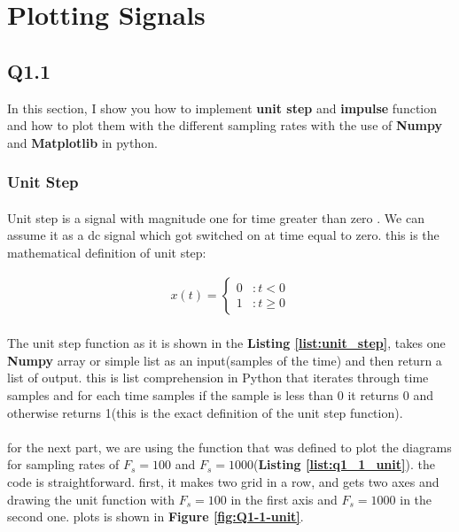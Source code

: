 \section{Plotting Signals}
\subsection{Q1.1}
In this section, I show you how to implement \textbf{unit step}
 and \textbf{impulse} function and how to plot them 
 with the different sampling rates with the use of 
 \textbf{Numpy} and \textbf{Matplotlib} in python.
\subsubsection{Unit Step}

\paragraph{} Unit step is a signal with magnitude one for time greater than zero . We can assume it as a dc signal which got switched on at time equal to zero.
this is the mathematical definition of unit step:

 \begin{align}
  x(t) = \begin{cases}
   0 &: t<0\\
   1 &: t\geq 0\end{cases}
 \end{align}

 \paragraph{}The unit step function as it is shown in the
  \textbf{Listing \ref{list:unit_step}}, takes one \textbf{Numpy} 
  array or simple list as an input(samples of the time) and then
  return a list of output. this is list comprehension in 
  Python that iterates through time samples and for each 
  time samples if the sample is less than 0 it returns 
  0 and otherwise returns 1(this is the exact definition 
  of the unit step function). 


\paragraph{}for the next part, we are using the function that was defined to 
plot the diagrams for sampling rates of  $F_s=100$ and 
$F_s=1000$(\textbf{Listing \ref{list:q1_1_unit}}). the code is 
straightforward. first, it makes two grid in a row, and gets 
two axes and drawing the unit function with $F_s=100$ in the 
first axis and $F_s=1000$ in the second one. plots is shown in \textbf{Figure \ref{fig:Q1-1-unit}}.

